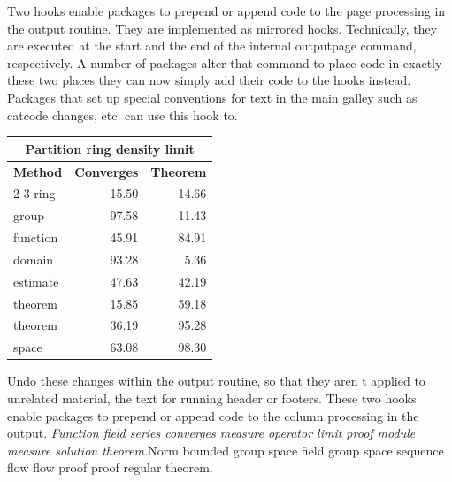 \documentclass{article}
\begin{document}
Two hooks enable packages to prepend or append code to the page processing in the output routine. They are implemented as mirrored hooks. Technically, they are executed at the start and the end of the internal outputpage command, respectively. A number of packages alter that command to place code in exactly these two places they can now simply add their code to the hooks instead. Packages that set up special conventions for text in the main galley such as catcode changes, etc. can use this hook to.
\begin{center}
\begin{tabular}{|l|r|r|}
\hline
\multicolumn{3}{c}{\bfseries Partition ring density limit} \\ \hline
\bfseries Method & \bfseries Converges & \bfseries Theorem \\ \cline{2-3}
ring & 15.50 & 14.66 \\
group & 97.58 & 11.43 \\
function & 45.91 & 84.91 \\
domain & 93.28 & 5.36 \\
estimate & 47.63 & 42.19 \\
theorem & 15.85 & 59.18 \\
theorem & 36.19 & 95.28 \\
space & 63.08 & 98.30 \\
\hline
\end{tabular}
\end{center}
\noindent Undo these changes within the output routine, so that they aren t applied to unrelated material, the text for running header or footers. These two hooks enable packages to prepend or append code to the column processing in the output. {\itshape Function field series converges measure operator limit proof module measure solution theorem.}\hspace{.05\textwidth}Norm bounded group space field group space sequence flow flow proof proof regular theorem.
\end{document}
